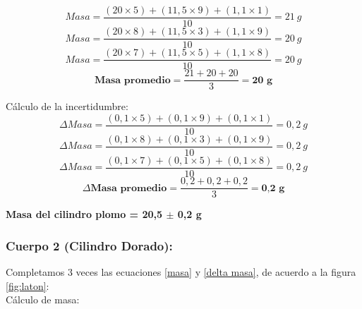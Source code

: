 \documentclass[10pt]{article}
\begin{document}
\begin{equation*} 
    Masa = \frac{(20\times5)+(11,5\times9)+(1,1\times1)}{10} = 21~g
\end{equation*}
\begin{equation*}
    Masa = \frac{(20\times8)+(11,5\times3)+(1,1\times9)}{10} = 20~g
\end{equation*}
\begin{equation*}
    Masa = \frac{(20\times7)+(11,5\times5)+(1,1\times8)}{10} = 20~g
\end{equation*}
\vspace{0.2cm}
\begin{equation*}
    \textbf{Masa~promedio}= \frac{21+20+20}{3} = \textbf{20~g}
\end{equation*}
\vspace{0.1cm}

Cálculo de la incertidumbre:
\begin{equation*}
     \Delta Masa =\frac{(0,1\times5)+(0,1\times9)+(0,1\times1)}{10} = 0,2~g
\end{equation*}
\begin{equation*}
     \Delta Masa =\frac{(0,1\times8)+(0,1\times3)+(0,1\times9)}{10} = 0,2~g
\end{equation*}
\begin{equation*}
     \Delta Masa =\frac{(0,1\times7)+(0,1\times5)+(0,1\times8)}{10} = 0,2~g
\end{equation*}
\vspace{0.2cm}
\begin{equation*}
    \Delta \textbf{Masa~promedio} = \frac{0,2+0,2+0,2}{3} = \textbf{0,2~g}
\end{equation*}

\vspace{0.3cm}
\begin{center}
    \textbf{Masa del cilindro plomo = 20,5 $\pm$ 0,2 g}
\end{center}

\subsubsection{Cuerpo 2 (Cilindro Dorado):}
\vspace{0,2cm}

Completamos 3 veces las ecuaciones \ref{masa} y \ref{delta masa}, de acuerdo a la figura \ref{fig:laton}:\\

Cálculo de masa:
\end{document}
